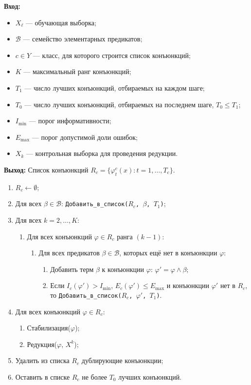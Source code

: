 \begin{itemize}
\textbf{Вход:}
\begin{itemize}
    \item $X_\ell$ --- обучающая выборка;
    \item $\mathcal{B}$ --- семейство элементарных предикатов;
    \item $c \in Y$ --- класс, для которого строится список конъюнкций;
    \item $K$ --- максимальный ранг конъюнкций;
    \item $T_1$ --- число лучших конъюнкций, отбираемых на каждом шаге;
    \item $T_0$ --- число лучших конъюнкций, отбираемых на последнем шаге, $T_0 \leq T_1$;
    \item $I_{\min}$ --- порог информативности;
    \item $E_{\max}$ --- порог допустимой доли ошибок;
    \item $X_k$ --- контрольная выборка для проведения редукции.
\end{itemize}

\textbf{Выход:} Список конъюнкций $R_c = \{\varphi_t^c(x) : t = 1, \dots, T_c\}$.

\begin{enumerate}
    \item $R_c \gets \emptyset$;
    \item Для всех $\beta \in \mathcal{B}$: \texttt{Добавить\_в\_список($R_c$, $\beta$, $T_1$)};
    \item Для всех $k = 2, \dots, K$:
    \begin{enumerate}
        \item Для всех конъюнкций $\varphi \in R_c$ ранга $(k-1)$:
        \begin{enumerate}
            \item Для всех предикатов $\beta \in \mathcal{B}$, которых ещё нет в конъюнкции $\varphi$:
            \begin{enumerate}
                \item Добавить терм $\beta$ к конъюнкции $\varphi$: $\varphi' = \varphi \land \beta$;
                \item Если $I_c(\varphi') > I_{\min}$, $E_c(\varphi') \leq E_{\max}$ и конъюнкции $\varphi'$ нет в $R_c$, то \texttt{Добавить\_в\_список($R_c$, $\varphi'$, $T_1$)}.
            \end{enumerate}
        \end{enumerate}
    \end{enumerate}
    \item Для всех конъюнкций $\varphi \in R_c$:
    \begin{enumerate}
        \item Стабилизация($\varphi$);
        \item Редукция($\varphi$, $X^k$);
    \end{enumerate}
    \item Удалить из списка $R_c$ дублирующие конъюнкции;
    \item Оставить в списке $R_c$ не более $T_0$ лучших конъюнкций.
\end{enumerate}



\end{itemize}
